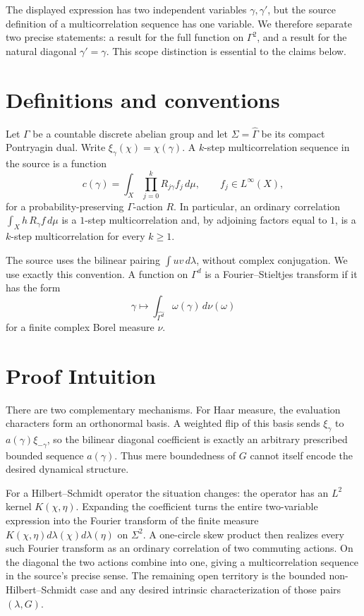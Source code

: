 \documentclass[11pt]{article}
\begin{document}
The displayed expression has two independent variables $\gamma,\gamma'$, but
the source definition of a multicorrelation sequence has one variable.  We
therefore separate two precise statements: a result for the full function on
$\Gamma^2$, and a result for the natural diagonal $\gamma'=\gamma$.  This
scope distinction is essential to the claims below.

\section{Definitions and conventions}

Let $\Gamma$ be a countable discrete abelian group and let
$\Sigma=\widehat\Gamma$ be its compact Pontryagin dual.  Write
$\xi_\gamma(\chi)=\chi(\gamma)$.  A $k$-step multicorrelation sequence in the
source is a function
\[
 c(\gamma)=\int_X\prod_{j=0}^{k}R_{j\gamma}f_j\,d\mu,
 \qquad f_j\in L^\infty(X),
\]
for a probability-preserving $\Gamma$-action $R$.  In particular, an ordinary
correlation $\int_X h\,R_\gamma f\,d\mu$ is a $1$-step multicorrelation and,
by adjoining factors equal to $1$, is a $k$-step multicorrelation for every
$k\geq 1$.

The source uses the bilinear pairing $\int uv\,d\lambda$, without complex
conjugation.  We use exactly this convention.  A function on $\Gamma^d$ is a
Fourier--Stieltjes transform if it has the form
\[
 \gamma\longmapsto \int_{\widehat{\Gamma^d}}\omega(\gamma)\,d\nu(\omega)
\]
for a finite complex Borel measure $\nu$.

\section{Proof Intuition}

There are two complementary mechanisms.  For Haar measure, the evaluation
characters form an orthonormal basis.  A weighted flip of this basis sends
$\xi_\gamma$ to $a(\gamma)\xi_{-\gamma}$, so the bilinear diagonal coefficient
is exactly an arbitrary prescribed bounded sequence $a(\gamma)$.  Thus mere
boundedness of $G$ cannot itself encode the desired dynamical structure.

For a Hilbert--Schmidt operator the situation changes: the operator has an
$L^2$ kernel $K(\chi,\eta)$.  Expanding the coefficient turns the entire
two-variable expression into the Fourier transform of the finite measure
$K(\chi,\eta)d\lambda(\chi)d\lambda(\eta)$ on $\Sigma^2$.  A one-circle skew
product then realizes every such Fourier transform as an ordinary correlation
of two commuting actions.  On the diagonal the two actions combine into one,
giving a multicorrelation sequence in the source's precise sense.  The
remaining open territory is the bounded non-Hilbert--Schmidt case and any
desired intrinsic characterization of those pairs $(\lambda,G)$.
\end{document}
